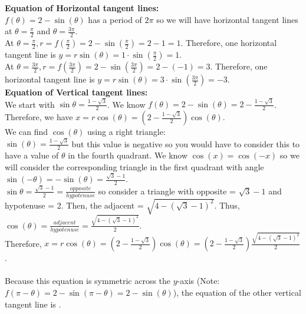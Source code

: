 \documentclass[noinstructornotest]{ximera}
\begin{document}
\begin{problem}
\begin{freeResponse}
		\textbf{Equation of Horizontal tangent lines:}\\
		$f(\theta) = 2 - \sin(\theta)$ has a period of $2\pi$ so we will have horizontal tangent lines at $\theta = \frac{\pi}{2}$ and $\theta = \frac{3\pi}{2}$.  \\
		
		At $\theta = \frac{\pi}{2}, r = f\left( \frac{\pi}{2} \right) = 2 - \sin \left( \frac{\pi}{2} \right) = 2 -1 = 1$.  Therefore, one horizontal tangent line is $y=r\sin(\theta) = 1 \cdot \sin \left( \frac{\pi}{2} \right) = 1$. \\
		
	    At $\theta = \frac{3\pi}{2}, r = f\left( \frac{3\pi}{2} \right) = 2 - \sin \left( \frac{3\pi}{2} \right) = 2 - (-1) = 3$.  Therefore, one horizontal tangent line is $y=r\sin(\theta) = 3 \cdot \sin \left( \frac{3\pi}{2} \right) = -3$. \\
	    
	    \textbf{Equation of Vertical tangent lines:}\\
	    We start with $\sin \theta = \frac{1-\sqrt{3}}{2}$.  
	    We know $f(\theta) = 2 - \sin(\theta) = 2 -  \frac{1-\sqrt{3}}{2}$.  
	    Therefore, we have $x=r\cos(\theta) = \left(2 -  \frac{1-\sqrt{3}}{2} \right) \cos(\theta)$. \\  
	    We can find $\cos(\theta)$ using a right triangle:\\
	    $\sin(\theta) =  \frac{1-\sqrt{3}}{2}$ but this value is negative so you would have to consider this to have a value of $\theta$ in the fourth quadrant.  We know $\cos(x) = \cos(-x)$ so we will consider the corresponding triangle in the first quadrant with angle $\sin(-\theta) = -\sin(\theta) = \frac{\sqrt{3}-1}{2}$. \\
	    $\sin \theta = \frac{\sqrt{3}-1}{2} = \frac{opposite}{hypotenuse}$ 
	    so consider a triangle with opposite = $\sqrt{3}-1$ and hypotenuse = 2. 
	    Then, the adjacent = $\sqrt{4-(\sqrt{3}-1)^2}$.  
	    Thus, $\cos(\theta)  = \frac{adjacent}{hypotenuse} = \frac{\sqrt{4-(\sqrt{3}-1)^2}}{2}$.  \\
	    Therefore, $x=r\cos(\theta) = \left(2 -  \frac{1-\sqrt{3}}{2} \right) \cos(\theta) = \left(2 -  \frac{1-\sqrt{3}}{2} \right) \frac{\sqrt{4-(\sqrt{3}-1)^2}}{2}$. \\ 
 \\

	    Because this equation is symmetric across the $y$-axis (Note: $f(\pi-\theta)=2-\sin(\pi -\theta) = 2-\sin(\theta)$), the equation of the other vertical tangent line is .
	    
		
		
		
	\end{freeResponse}
	
\end{problem}
\end{document}
